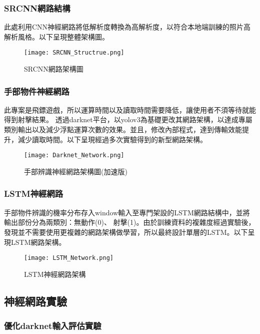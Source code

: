 \subsubsection{SRCNN網路結構}
此處利用CNN神經網路將低解析度轉換為高解析度，以符合本地端訓練的照片高解析風格。以下呈現整體架構圖。

\begin{figure}[H]
    \centering
    \texttt{[image: SRCNN\_Structrue.png]}
    \caption{SRCNN網路架構圖}
    \label{fig:SRCNN網路架構圖}
\end{figure}
\subsubsection{手部物件神經網路}

此專案是飛鏢遊戲，所以運算時間以及讀取時間需要降低，讓使用者不須等待就能得到射擊結果。
透過darknet平台，以yolov3為基礎更改其網路架構，以達成專屬類別輸出以及減少浮點運算次數的效果。並且，修改內部程式，達到傳輸效能提升，減少讀取時間。以下呈現經過多次實驗得到的新型網路架構。
\begin{figure}[H]
    \centering
    \texttt{[image: Darknet\_Network.png]}
    \caption{手部辨識神經網路架構圖(加速版)}
    \label{fig:手部辨識神經網路架構圖(加速版)}
\end{figure}



\subsubsection{LSTM神經網路}
手部物件辨識的機率分布存入window輸入至專門架設的LSTM網路結構中，並將輸出部份分為兩類別：無動作(0)、 射擊(1)。由於訓練資料的複雜度經過實驗後，發現並不需要使用更複雜的網路架構做學習，所以最終設計單層的LSTM。以下呈現LSTM網路架構。

\begin{figure}[H]
    \centering
    \texttt{[image: LSTM\_Network.png]}
    \caption{LSTM神經網路架構}
    \label{fig:LSTM神經網路架構}
\end{figure}


\subsection{神經網路實驗}

\subsubsection{優化darknet輸入評估實驗}

